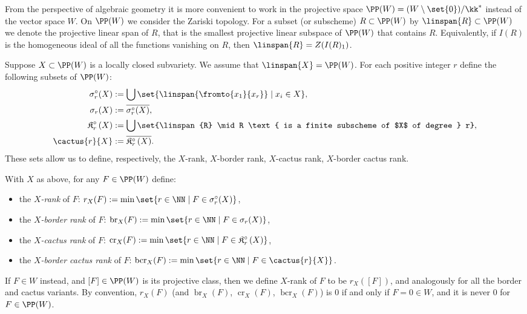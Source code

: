\documentclass[12pt,a4paper]{article}
\newcommand{\borderrank}[2][X]{\operatorname{br}_{#1}(#2)}
\newcommand{\cactusrank}[2][X]{\operatorname{cr}_{#1}(#2)}
\newcommand{\bordercactusrank}[2][X]{\operatorname{bcr}_{#1}(#2)}
\newcommand{\cactusop}[2]{\mathfrak{K}^{\circ}_{#1}\left( #2 \right)}
\begin{document}
From the perspective of algebraic geometry it is more convenient to work in the projective space $\PP(W) = (W\setminus\set{0})/\kk^*$ instead of the vector space $W$.
On $\PP(W)$ we consider the Zariski topology.
For a subset (or subscheme) $R\subset \PP(W)$ by $\linspan{R}\subset \PP (W)$ we denote the projective linear span of $R$, that is the smallest projective linear subspace of $\PP(W)$ that contains $R$.
Equivalently, if $I(R)$ is the homogeneous ideal of all the functions vanishing on $R$,
then $\linspan{R}= Z(I(R)_1)$.


Suppose $X\subset \PP(W)$ is a locally closed subvariety.
We assume that $\linspan{X}=\PP(W)$.
For each positive integer $r$ define the following subsets of $\PP(W)$:
\begin{subequations}
\begin{align}
   \sigma^{\circ}_r(X)&:= \bigcup\set{\linspan{\fromto{x_1}{x_r}}  \mid x_i\in X}, \\
   \sigma_r(X)&:=\overline{\sigma^{\circ}_r(X)},\\
   \cactusop{r}{X}&:= \bigcup\set{\linspan{R}  \mid R \text{ is a finite subscheme of $X$ of degree } r},
   \label{equ_define_plain_cactus}
   \\
   \cactus{r}{X}&:=\overline{\cactusop{r}{X}}.
   \label{equ_define_cactus}
\end{align}
\end{subequations}
These sets allow us to define, respectively, the $X$-rank, $X$-border rank, $X$-cactus rank, $X$-border cactus rank.
\begin{defin}\label{def_ranks}
   With $X$ as above,
     for any $F\in \PP(W)$ define:
   \begin{itemize}
    \item the $X$\emph{-rank} of $F$:
    $r_X(F):= \min\set {r\in \NN \mid F\in \sigma^{\circ}_r(X)}$,
    \item the $X$\emph{-border rank} of $F$:
    $\borderrank{F}:= \min\set {r\in \NN \mid F\in \sigma_r(X)}$,
    \item the $X$\emph{-cactus rank} of $F$:
    $\cactusrank{F}:= \min\set{r\in \NN \mid F\in \cactusop{r}{X}}$,
    \item the $X$\emph{-border cactus rank} of $F$:
    $\bordercactusrank{F}:= \min\set{r\in \NN \mid F\in \cactus{r}{X}}$.
   \end{itemize}
   If $F\in W$ instead, and $[F]\in \PP(W)$ is its projective class,
   then we define $X$-rank of $F$ to be $r_X([F])$, and analogously for all the border and cactus variants.
   By convention, $r_X(F)$ (and $\borderrank{F}$, $\cactusrank{F}$, $\bordercactusrank{F}$)
   is $0$ if and only if $F=0\in W$, and it is never $0$ for $F\in \PP(W)$.
\end{defin}
\end{document}
